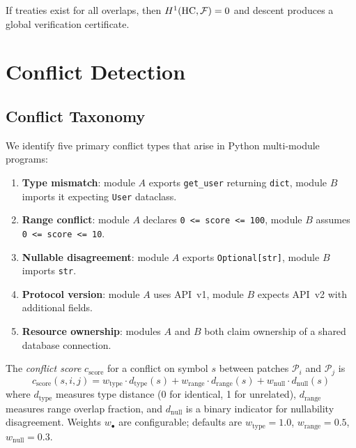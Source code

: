 \documentclass[11pt]{article}
\newcommand{\patch}{\mathcal{P}}
\newcommand{\cscore}[1][]{c_{\mathrm{score}#1}}
\newcommand{\HC}{\mathrm{HC}}
\newcommand{\Sect}{\mathcal{F}}             %
\begin{document}
\begin{corollary}\label{cor:global}
If treaties exist for all overlaps, then $\Hcoh{1}(\HC, \Sect) = 0$
and descent produces a global verification certificate.
\end{corollary}

\section{Conflict Detection}\label{sec:conflict}

\subsection{Conflict Taxonomy}

We identify five primary conflict types that arise in Python
multi-module programs:

\begin{enumerate}[nosep]
\item \textbf{Type mismatch}: module $A$ exports \texttt{get\_user}
  returning \texttt{dict}, module $B$ imports it expecting
  \texttt{User} dataclass.
\item \textbf{Range conflict}: module $A$ declares
  \texttt{0 <= score <= 100}, module $B$ assumes
  \texttt{0 <= score <= 10}.
\item \textbf{Nullable disagreement}: module $A$ exports
  \texttt{Optional[str]}, module $B$ imports \texttt{str}.
\item \textbf{Protocol version}: module $A$ uses API~v1, module $B$
  expects API~v2 with additional fields.
\item \textbf{Resource ownership}: modules $A$ and $B$ both claim
  ownership of a shared database connection.
\end{enumerate}

\begin{definition}\label{def:score}
The \emph{conflict score} $\cscore$ for a conflict on symbol $s$
between patches $\patch_i$ and $\patch_j$ is
\[
  \cscore(s, i, j) = w_{\mathrm{type}} \cdot d_{\mathrm{type}}(s)
    + w_{\mathrm{range}} \cdot d_{\mathrm{range}}(s)
    + w_{\mathrm{null}} \cdot d_{\mathrm{null}}(s)
\]
where $d_{\mathrm{type}}$ measures type distance (0 for identical,
1 for unrelated), $d_{\mathrm{range}}$ measures range overlap
fraction, and $d_{\mathrm{null}}$ is a binary indicator for
nullability disagreement.  Weights $w_\bullet$ are configurable;
defaults are $w_{\mathrm{type}} = 1.0$, $w_{\mathrm{range}} = 0.5$,
$w_{\mathrm{null}} = 0.3$.
\end{definition}
\end{document}
